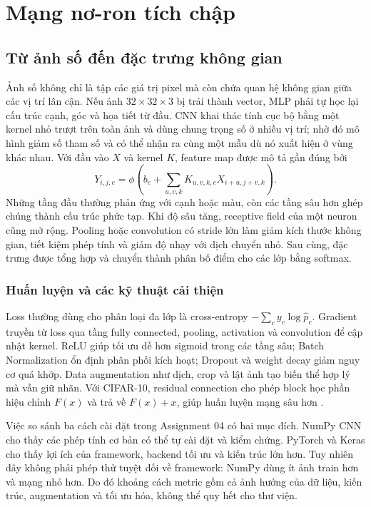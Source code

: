 \documentclass[12pt,a4paper]{report}
\begin{document}
\chapter{Mạng nơ-ron tích chập}\label{ch:cnn}
\section{Từ ảnh số đến đặc trưng không gian}
Ảnh số không chỉ là tập các giá trị pixel mà còn chứa quan hệ không gian giữa các vị trí lân cận. Nếu ảnh $32\times32\times3$ bị trải thành vector, MLP phải tự học lại cấu trúc cạnh, góc và họa tiết từ đầu. CNN khai thác tính cục bộ bằng một kernel nhỏ trượt trên toàn ảnh và dùng chung trọng số ở nhiều vị trí; nhờ đó mô hình giảm số tham số và có thể nhận ra cùng một mẫu dù nó xuất hiện ở vùng khác nhau. Với đầu vào $X$ và kernel $K$, feature map được mô tả gần đúng bởi
\begin{equation}Y_{i,j,c}=\phi\left(b_c+\sum_{u,v,k}K_{u,v,k,c}X_{i+u,j+v,k}\right).\end{equation}
Những tầng đầu thường phản ứng với cạnh hoặc màu, còn các tầng sâu hơn ghép chúng thành cấu trúc phức tạp. Khi độ sâu tăng, receptive field của một neuron cũng mở rộng. Pooling hoặc convolution có stride lớn làm giảm kích thước không gian, tiết kiệm phép tính và giảm độ nhạy với dịch chuyển nhỏ. Sau cùng, đặc trưng được tổng hợp và chuyển thành phân bố điểm cho các lớp bằng softmax.

\subsection{Huấn luyện và các kỹ thuật cải thiện}
Loss thường dùng cho phân loại đa lớp là cross-entropy $-\sum_c y_c\log\hat p_c$. Gradient truyền từ loss qua tầng fully connected, pooling, activation và convolution để cập nhật kernel. ReLU giúp tối ưu dễ hơn sigmoid trong các tầng sâu; Batch Normalization ổn định phân phối kích hoạt; Dropout và weight decay giảm nguy cơ quá khớp. Data augmentation như dịch, crop và lật ảnh tạo biến thể hợp lý mà vẫn giữ nhãn. Với CIFAR-10, residual connection cho phép block học phần hiệu chỉnh $F(x)$ và trả về $F(x)+x$, giúp huấn luyện mạng sâu hơn \cite{resnet2016}.

Việc so sánh ba cách cài đặt trong Assignment 04 có hai mục đích. NumPy CNN cho thấy các phép tính cơ bản có thể tự cài đặt và kiểm chứng. PyTorch và Keras cho thấy lợi ích của framework, backend tối ưu và kiến trúc lớn hơn. Tuy nhiên đây không phải phép thử tuyệt đối về framework: NumPy dùng ít ảnh train hơn và mạng nhỏ hơn. Do đó khoảng cách metric gồm cả ảnh hưởng của dữ liệu, kiến trúc, augmentation và tối ưu hóa, không thể quy hết cho thư viện.
\end{document}
